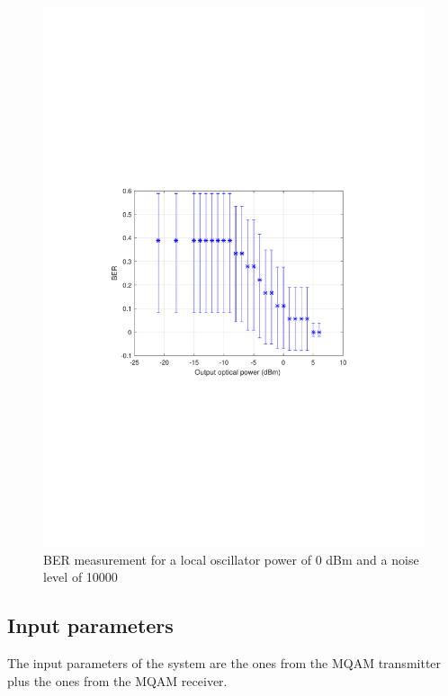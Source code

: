 \begin{figure}
	\centering
	\includegraphics[width=\textwidth]{./figures/BER_LO0_Noise10000}
	\caption{BER measurement for a local oscillator power of 0 dBm and a noise level of 10000}\label{fig:BER10000}
\end{figure}

\subsection*{Input parameters}

The input parameters of the system are the ones from the MQAM transmitter plus the ones from the MQAM receiver.

